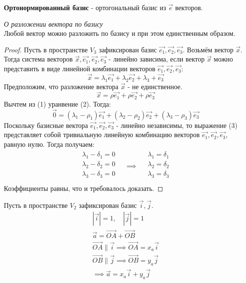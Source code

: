\begin{definition}
  \textbf{Ортонормированный базис} - ортогональный базис из $\vec{e}$ векторов.
\end{definition}

\begin{theorem}
  \textit{О разложении вектора по базису} \\
  Любой вектор можно разложить по базису и при этом единственным образом.
\end{theorem}
\begin{proof}
  Пусть в пространстве $V_3$ зафиксирован базис $\vec{e_1}, \vec{e_2}, \vec{e_3}$. Возьмём вектор $\vec{x}$. Тогда система векторов $\vec{x}, \vec{e_1}, \vec{e_2}, \vec{e_3}$ - линейно зависима, если вектор $\vec{x}$ можно представить в виде линейной комбинации векторов $\vec{e_1}, \vec{e_2}, \vec{e_3}$: \[
  \vec{x} = \lambda_1 \vec{e_1} + \lambda_2 \vec{e_2} + \lambda_3 + \vec{e_3} \tag{1}
\]
  Предположим, что разложение вектора $\vec{x}$ - не единственное. \[
  \vec{x} = \rho \vec{e_1} + \rho \vec{e_2} + \rho \vec{e_3} \tag{2}
\]
  Вычтем из (1) уранвение (2). Тогда: \[
    \vec{0} = \left( \lambda_1 - \rho_1 \right) \vec{e_1} + \left( \lambda_2 - \rho_2 \right) \vec{e_2} + \left( \lambda_3 - \rho_3 \right) \vec{e_3} \tag{3}
\]
Поскольку базисные вектора $\vec{e_1}, \vec{e_2}, \vec{e_3}$ - линейно независимы, то выражение (3) представляет собой тривиальную линейную комбинацию векторов $\vec{e_1}, \vec{e_2}, \vec{e_3}$, равную нулю. Тогда получаем:
  \begin{gather*}
    \begin{matrix}  
      \lambda_1 - \delta_1 = 0 \\
      \lambda_2 - \delta_2 = 0 \\
      \lambda_3 - \delta_3 = 0 \\
    \end{matrix}
    \quad \implies \quad
    \begin{matrix}
      \lambda_1 = \delta_1 \\
      \lambda_2 = \delta_2 \\
      \lambda_3 = \delta_3 \\
    \end{matrix}
  \end{gather*}
  Коэффициенты равны, что и требовалось доказать.
\end{proof}
\begin{eg}
  Пусть в пространстве $V_2$ зафиксирован базис $\vec{i}, \vec{j}$.
  \begin{gather*}
    |\vec{i}| = 1, \quad |\vec{j}| = 1 \\
    \vec{a} = \overrightarrow{OA} + \overrightarrow{OB} \\
    \overrightarrow{OA} \parallel \vec{i} \implies \overrightarrow{OA} = x_a \vec{i} \\
    \overrightarrow{OB} \parallel \vec{j} \implies \overrightarrow{OB} = y_a \vec{j} \\
    \implies \vec{a} = x_a \vec{i} + y_a \vec{j}
  \end{gather*}
\end{eg}
